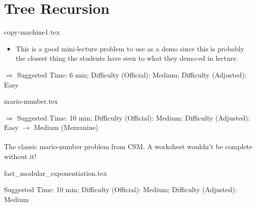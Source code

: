 \documentclass{exam}
\begin{document}
\section{Tree Recursion}
\begin{questions}
    {copy-machine1.tex}
    \begin{questionmeta}
        \begin{itemize}
            \item This is a good mini-lecture problem to use as a demo since this is probably the closest thing the students have seen to what they demo-ed in lecture.
        \end{itemize}
        $\Rightarrow$ Suggested Time: 6 min; Difficulty (Official): Medium; Difficulty (Adjusted): Easy
    \end{questionmeta}

    {mario-number.tex}
    \begin{questionmeta}
        $\Rightarrow$ Suggested Time: 10 min; Difficulty (Official): Medium; Difficulty (Adjusted): Easy $\rightarrow$ Medium (Mezzanine) \\ \\
        The classic mario-number problem from CSM. A worksheet wouldn't be complete without it!
    \end{questionmeta}

    {fast_modular_exponentiation.tex}
    \begin{questionmeta}
        Suggested Time: 10 min; Difficulty (Official): Medium; Difficulty (Adjusted): Medium
    \end{questionmeta}

\end{questions}
\end{document}
